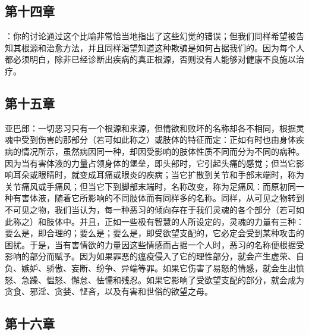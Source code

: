 \subsection{第十四章}

\par

：你的讨论通过这个比喻非常恰当地指出了这些幻觉的错误；但我们同样希望被告知其根源和治愈方法，并且同样渴望知道这种欺骗是如何占据我们的。因为每个人都必须明白，除非已经诊断出疾病的真正根源，否则没有人能够对健康不良施以治疗。\par


\subsection{第十五章}

\par

亚巴郎：一切恶习只有一个根源和来源，但情欲和败坏的名称却各不相同，根据灵魂中受到伤害的那部分（若可如此称之）或肢体的特征而定：正如有时也由身体疾病的情况所示，虽然病因同一种，却因受影响的肢体性质不同而分为不同的病种。因为当有害体液的力量占领身体的堡垒，即头部时，它引起头痛的感觉；但当它影响耳朵或眼睛时，就变成耳痛或眼炎的疾病；当它扩散到关节和手部末端时，称为关节痛风或手痛风；但当它下到脚部末端时，名称改变，称为足痛风：而原初同一种有害体液，随着它所影响的不同肢体而有同样多的名称。同样，从可见之物转到不可见之物，我们当认为，每一种恶习的倾向存在于我们灵魂的各个部分（若可如此称之）和肢体中。并且，正如一些极有智慧的人所设定的，灵魂的力量有三种：要么是，即合理的；要么是；要么是，即受欲望支配的，它必定会受到某种攻击的困扰。于是，当有害情欲的力量因这些情感而占据一个人时，恶习的名称便根据受影响的部分而赋予。因为如果罪恶的瘟疫侵入了它的理性部分，就会产生虚荣、自负、嫉妒、骄傲、妄断、纷争、异端等罪。如果它伤害了易怒的情感，就会生出愤怒、急躁、愠怒、懈怠、怯懦和残忍。如果它影响了受欲望支配的部分，就会成为贪食、邪淫、贪婪、悭吝，以及有害和世俗的欲望之母。\par


\subsection{第十六章}

